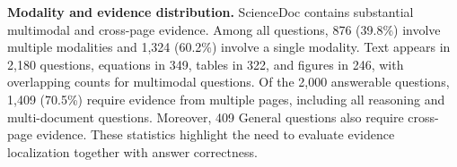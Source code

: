 \documentclass{article} %
\begin{document}
\textbf{Modality and evidence distribution.} ScienceDoc contains substantial multimodal and cross-page evidence. Among all questions, 876 (39.8\%) involve multiple modalities and 1,324 (60.2\%) involve a single modality. Text appears in 2,180 questions, equations in 349, tables in 322, and figures in 246, with overlapping counts for multimodal questions. Of the 2,000 answerable questions, 1,409 (70.5\%) require evidence from multiple pages, including all reasoning and multi-document questions. Moreover, 409 General questions also require cross-page evidence. These statistics highlight the need to evaluate evidence localization together with answer correctness. 






\end{document}
